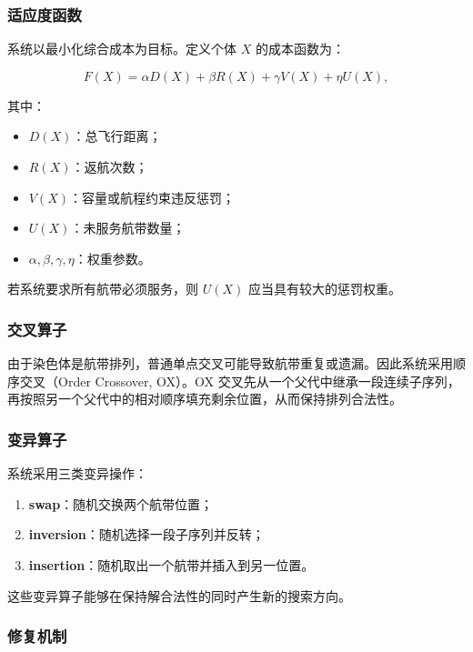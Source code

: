 \documentclass[UTF8,a4paper,12pt]{ctexart}
\begin{document}
\subsubsection{适应度函数}

系统以最小化综合成本为目标。定义个体 \(X\) 的成本函数为：

\[
F(X)=\alpha D(X)+\beta R(X)+\gamma V(X)+\eta U(X),
\]

其中：

\begin{itemize}
    \item \(D(X)\)：总飞行距离；
    \item \(R(X)\)：返航次数；
    \item \(V(X)\)：容量或航程约束违反惩罚；
    \item \(U(X)\)：未服务航带数量；
    \item \(\alpha,\beta,\gamma,\eta\)：权重参数。
\end{itemize}

若系统要求所有航带必须服务，则 \(U(X)\) 应当具有较大的惩罚权重。

\subsubsection{交叉算子}

由于染色体是航带排列，普通单点交叉可能导致航带重复或遗漏。因此系统采用顺序交叉（Order Crossover, OX）。OX 交叉先从一个父代中继承一段连续子序列，再按照另一个父代中的相对顺序填充剩余位置，从而保持排列合法性。

\subsubsection{变异算子}

系统采用三类变异操作：

\begin{enumerate}
    \item \textbf{swap}：随机交换两个航带位置；
    \item \textbf{inversion}：随机选择一段子序列并反转；
    \item \textbf{insertion}：随机取出一个航带并插入到另一位置。
\end{enumerate}

这些变异算子能够在保持解合法性的同时产生新的搜索方向。

\subsubsection{修复机制}
\end{document}
